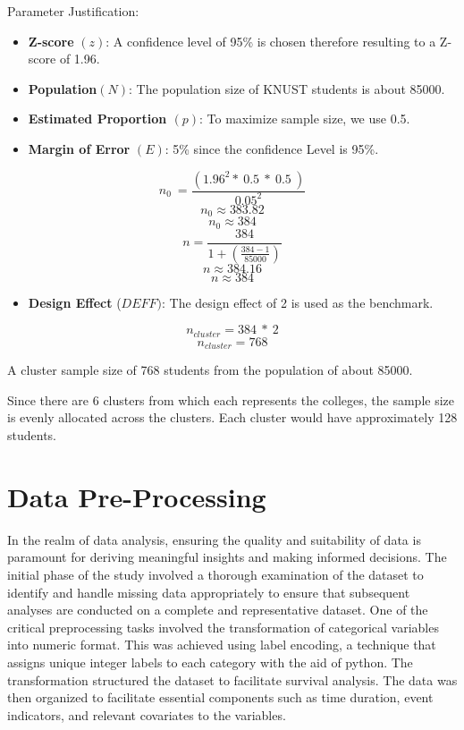 \documentclass[12pt]{report}
\begin{document}
Parameter Justification:

\begin{itemize}
    \item \textbf{Z-score} \((z)\): A confidence level of 95\% is chosen therefore resulting to a Z-score of 1.96.
    \item \textbf{Population}\( (N)\): The population size of KNUST students is about 85000.
    \item \textbf{Estimated Proportion \((p)\)}: To maximize sample size, we use 0.5.
    \item \textbf{Margin of Error }\((E)\): 5\% since the confidence Level is 95\%.


\end{itemize}


\[n_0\ =\frac{\left({1.96}^2\ast\ 0.5\ \ast\ 0.5\ \right)}{{0.05}^2}\]
\[n_0\approx383.82\]
\[n_0\approx384\]
\[n=\frac{384}{1+(\frac{384-1}{85000})}\]
\[n\approx384.16\]
\[n\approx384\]

\begin{itemize}
    \item \textbf{Design Effect} (\({DEFF})\): The design effect of 2 is used as the benchmark.

\end{itemize}
\[n_{cluster}=384\ \ast\ 2\]
\[n_{cluster}=768\]

A cluster sample size of 768 students from the population of about 85000.

Since there are 6 clusters from which each represents the colleges, the sample size is evenly allocated across the clusters. Each cluster would have approximately 128 students.



\section{Data Pre-Processing}

In the realm of data analysis, ensuring the quality and suitability of data is paramount for deriving meaningful insights and making informed decisions. The initial phase of the study involved a thorough examination of the dataset to identify and handle missing data appropriately to ensure that subsequent analyses are conducted on a complete and representative dataset. One of the critical preprocessing tasks involved the transformation of categorical variables into numeric format. This was achieved using label encoding, a technique that assigns unique integer labels to each category with the aid of python. The transformation structured the dataset to facilitate survival analysis. The data was then organized to facilitate essential components such as time duration, event indicators, and relevant covariates to the variables. 
\end{document}
